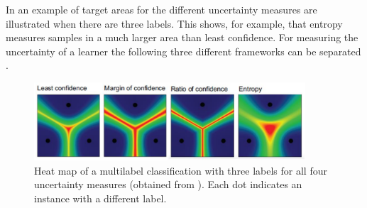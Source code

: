 In  an example of target areas for the different uncertainty measures are illustrated when there are three labels.
This shows, for example, that entropy measures samples in a much larger area than least confidence.
For measuring the uncertainty of a learner the following three different frameworks can be separated \cite{nguyen2021howtomeasure}.
\begin{figure}[H]
  \centering
    \includegraphics[width=0.9\textwidth]{figures/heat_map.pdf}
  \caption{Heat map of a multilabel classification with three labels for all four uncertainty measures (obtained from \cite{human-in-the-loop}).
  Each dot indicates an instance with a different label.}
  \label{fig:uncertainty_sampling_heatmap}
\end{figure}



%

